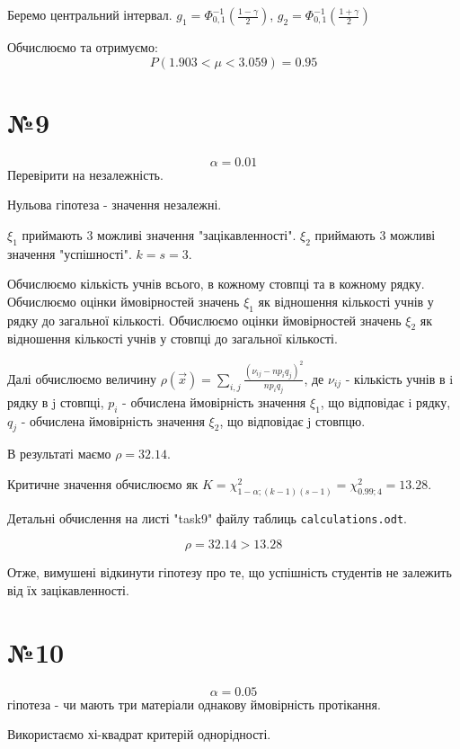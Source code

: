 \documentclass[11pt, a4paper]{article} %
\begin{document}
Беремо центральний інтервал. 
$g_1 = \Phi_{0,1}^{-1}\left(\frac{1-\gamma}{2}\right)$, $g_2 = \Phi_{0,1}^{-1}\left(\frac{1+\gamma}{2}\right)$

\begin{mdframed}[style=ans]    
    Обчислюємо та отримуємо:
    $$P(1.903 < \mu < 3.059) = 0.95$$
\end{mdframed}
\pagebreak

\section*{№9}
$$\alpha = 0.01$$
Перевірити на незалежність.

Нульова гіпотеза - значення незалежні.

$\xi_1$ приймають 3 можливі значення "зацікавленності".
$\xi_2$ приймають 3 можливі значення "успішності". 
$k = s = 3$.

Обчислюємо кількість учнів всього, в кожному стовпці та в кожному рядку.
Обчислюємо оцінки ймовірностей значень $\xi_1$ як відношення кількості учнів у рядку до загальної кількості.
Обчислюємо оцінки ймовірностей значень $\xi_2$ як відношення кількості учнів у стовпці до загальної кількості.

Далі обчислюємо величину $\rho(\vec x) = \sum_{i,j} \frac{(\nu_{ij} - n p_i q_j)^2}{np_iq_j}$, 
де $\nu_{ij}$ - кількість учнів в i рядку в j стовпці, $p_i$ - обчислена ймовірність значення $\xi_1$, що відповідає i рядку,
$q_j$ - обчислена ймовірність значення $\xi_2$, що відповідає j стовпцю.

В результаті маємо $\rho = 32.14$.

Критичне значення обчислюємо як $K = \chi^2_{1-\alpha; (k-1)(s-1)} =  \chi^2_{0.99; 4} = 13.28$.

Детальні обчислення на листі "task9" файлу таблиць \texttt{calculations.odt}.

\begin{mdframed}[style=ans]
    $$\rho = 32.14 > 13.28$$

    Отже, вимушені відкинути гіпотезу про те, що успішність студентів не залежить від їх зацікавленності.
\end{mdframed}
\pagebreak

\section*{№10}
$$\alpha=0.05$$
гіпотеза - чи мають три матеріали однакову ймовірність протікання.

Використаємо хі-квадрат критерій однорідності.
\end{document}
